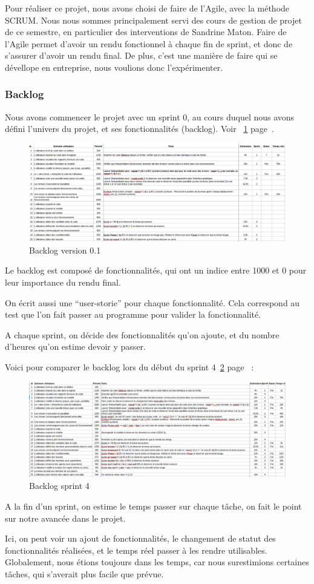 Pour réaliser ce projet, nous avons choisi de faire de l'Agile, avec la méthode SCRUM. Nous nous sommes principalement servi des cours de gestion de projet de ce semestre, en particulier des interventions de Sandrine Maton. Faire de l'Agile permet d'avoir un rendu fonctionnel à chaque fin de sprint, et donc de s'assurer d'avoir un rendu final. De plus, c'est une manière de faire qui se dévellope en entreprise, nous voulions donc l'expérimenter.
\subsubsection{Backlog}
Nous avons commencer le projet avec un sprint 0, au cours duquel nous avons défini l'univers du projet, et ses fonctionnalités (backlog). Voir ~\ref{backlogv1} page~\pageref{backlogv1}.


\begin{figure}[h]
\caption{\label{backlogv1} Backlog version 0.1}
\includegraphics[scale=0.35]{doc/report/uml/backlogv1.png}
\end{figure}
Le backlog est composé de fonctionnalités, qui ont un indice entre 1000 et 0 pour leur importance du rendu final.

 On écrit aussi une \enquote{user-storie} pour chaque fonctionnalité. Cela correspond au test que l'on fait passer au programme pour valider la fonctionnalité.


A chaque sprint, on décide des fonctionnalités qu'on ajoute, et du nombre d'heures qu'on estime devoir y passer.


Voici pour comparer le backlog lors du début du sprint 4~\ref{backlogsp4} page~\pageref{backlogsp4} :


\begin{figure}[h]
\caption{\label{backlogsp4} Backlog sprint 4}
\includegraphics[scale=0.35]{doc/report/uml/backlogsp4.png}
\end{figure}
A la fin d'un sprint, on estime le temps passer sur chaque tâche, on fait le point sur notre avancée dans le projet.

Ici, on peut voir un ajout de fonctionnalités, le changement de statut des fonctionnalités réalisées, et le temps réel passer à les rendre utilisables.
Globalement, nous étions toujours dans les temps, car nous surestimions certaines tâches, qui s'averait plus facile que prévue.


